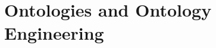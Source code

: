 




\section{Ontologies and Ontology Engineering}
\label{sec:ontologies-and-ontology-engineering}





